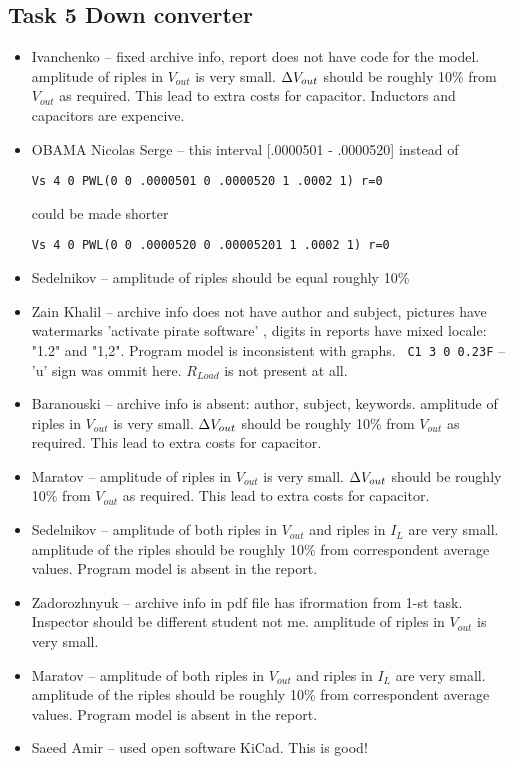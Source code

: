 \documentclass[a4paper,landscape,11pt]{article}
\begin{document}
\subsection{Task 5 Down converter}
\begin{itemize}
\item Ivanchenko -- fixed archive info, report does not have code for the model.
 amplitude of riples in $V_{out}$ is very small. ${\small \Delta}V_{out}$ should be roughly 10\% from $V_{out}$ as required. This lead to extra costs for capacitor.
                     Inductors and capacitors are expencive.
\item OBAMA Nicolas Serge -- this interval [.0000501 - .0000520]  instead of
\begin{verbatim}
Vs 4 0 PWL(0 0 .0000501 0 .0000520 1 .0002 1) r=0
\end{verbatim}
could be made shorter
\begin{verbatim}
Vs 4 0 PWL(0 0 .0000520 0 .00005201 1 .0002 1) r=0
\end{verbatim}

\item Sedelnikov --   amplitude of riples should be equal roughly 10\%

\item Zain Khalil -- archive info does not have author and subject, pictures have watermarks 'activate pirate software' , digits in reports have mixed locale: "1.2" and "1,2".
                     Program model is inconsistent with graphs. {\tt~C1~3~0~0.23F} -- 'u' sign was ommit here. $R_{Load}$ is not present at all.
\item Baranouski -- archive info is absent: author, subject, keywords. amplitude of riples in $V_{out}$ is very small.  ${\small \Delta}V_{out}$ should be roughly 10\% from $V_{out}$ as required. This lead to extra costs for capacitor.
\item Maratov --     amplitude of riples in $V_{out}$ is very small. ${\small \Delta}V_{out}$ should be roughly 10\% from $V_{out}$ as required. This lead to extra costs for capacitor.

\item Sedelnikov --  amplitude of both riples in $V_{out}$  and riples in $I_{L}$ are very small. amplitude of the riples should be roughly 10\% from correspondent average values.
                   Program model is absent in the report.
\item Zadorozhnyuk -- archive info in pdf file has ifrormation from 1-st task. Inspector should be different student not me.  amplitude of riples in $V_{out}$ is very small.
\item Maratov -- amplitude of both riples in $V_{out}$  and riples in $I_{L}$ are very small. amplitude of the riples should be roughly 10\% from correspondent average values.
                   Program model is absent in the report.
\item Saeed Amir -- used open software KiCad. This is good!
\end{itemize}
\end{document}

